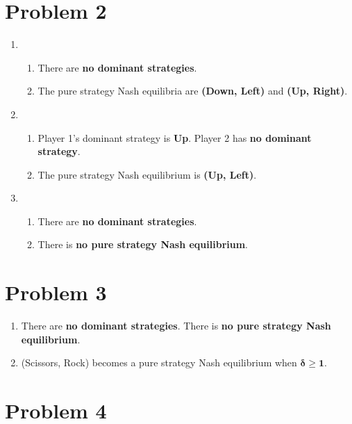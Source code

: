 \documentclass{article}
\begin{document}
\section*{Problem 2}

\begin{enumerate}
    \item 
    \begin{enumerate}[i]
        \item There are \textbf{no dominant strategies}.
        \item The pure strategy Nash equilibria are \textbf{(Down, Left)} and
            \textbf{(Up, Right)}.
    \end{enumerate}
    \item
    \begin{enumerate}[i]
        \item Player 1's dominant strategy is \textbf{Up}. Player 2 has
            \textbf{no dominant strategy}.
        \item The pure strategy Nash equilibrium is \textbf{(Up, Left)}.
    \end{enumerate}
    \item
    \begin{enumerate}[i]
        \item There are \textbf{no dominant strategies}.
        \item There is \textbf{no pure strategy Nash equilibrium}.
    \end{enumerate}
    
\end{enumerate}

\section*{Problem 3}

\begin{enumerate}
    \item There are \textbf{no dominant strategies}. There is \textbf{no pure
        strategy Nash equilibrium}.
    \item (Scissors, Rock) becomes a pure strategy Nash equilibrium when
        $\bm{\delta \geq 1}$.
\end{enumerate}

\section*{Problem 4}
\end{document}
